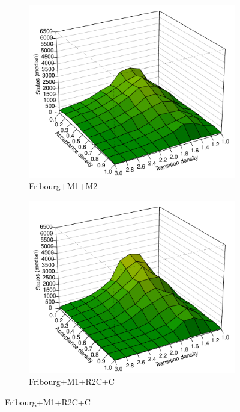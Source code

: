 \begin{figure}[ht]
  \hfill
  \begin{subfigure}[t]{\perspwidth\textwidth}
  \centering
  \includegraphics[width=\textwidth]{figures/r/internal/goal/s.median.Fribourg+M1+M2.pdf}
  \caption{Fribourg+M1+M2}
  \end{subfigure}
  \hfill
  \begin{subfigure}[t]{\perspwidth\textwidth}
  \centering
  \includegraphics[width=\textwidth]{figures/r/internal/goal/s.median.Fribourg+M1+R2C+C.pdf}
  \caption{Fribourg+M1+R2C+C}
  \end{subfigure}
  \hfill
\label{i.g.persp_2}
\end{figure}


